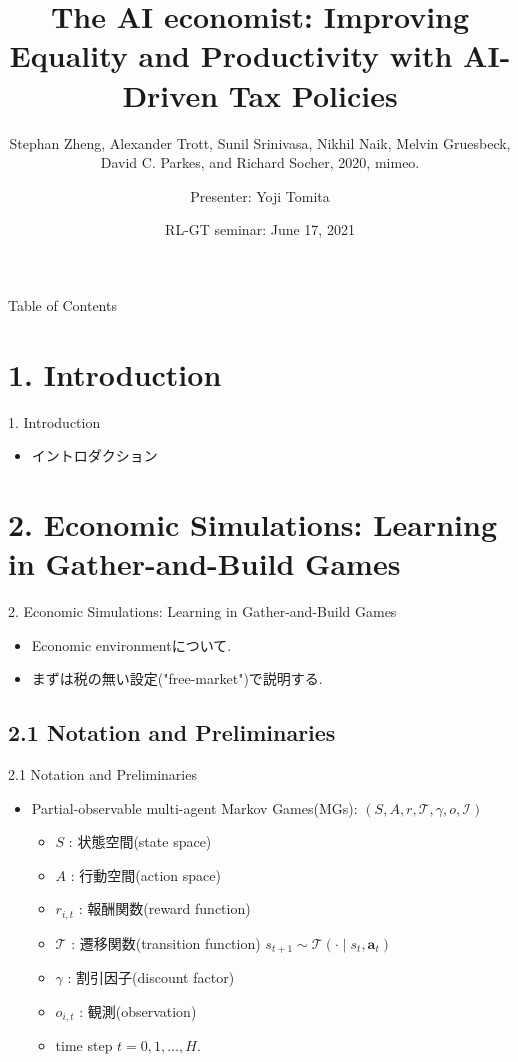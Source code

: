 \documentclass[unicode,aspectratio=169,11pt]{beamer}
\title{
    The AI economist:
    Improving Equality and Productivity with AI-Driven Tax Policies
}
\subtitle{Stephan Zheng, Alexander Trott, Sunil Srinivasa, Nikhil Naik, Melvin Gruesbeck, David C. Parkes, and Richard Socher, 2020, mimeo.}
\author{Presenter: Yoji Tomita}
\date{RL-GT seminar: June 17, 2021}
\begin{document}
\maketitle

\begin{frame}{Table of Contents}
    \setcounter{tocdepth}{1}
    \tableofcontents
\end{frame}

\section{1. Introduction}
\begin{frame}{1. Introduction}
    \begin{itemize}
        \item イントロダクション
    \end{itemize}
\end{frame}

\section{2. Economic Simulations: Learning in Gather-and-Build Games}

\begin{frame}{2. Economic Simulations: Learning in Gather-and-Build Games}{}
    \begin{itemize}
        \item Economic environmentについて.
        \item まずは税の無い設定("free-market")で説明する.
    \end{itemize}
\end{frame}

\subsection{2.1 Notation and Preliminaries}
\begin{frame}{2.1 Notation and Preliminaries}
    \begin{itemize}
        \item Partial-observable multi-agent Markov Games(MGs): $(S, A, r, \mathscr{T}, \gamma, o, \mathscr{I})$
        \begin{itemize}
            \item $S$ : 状態空間(state space)
            \item $A$ : 行動空間(action space)
            \item $r_{i,t}$ : 報酬関数(reward function)
            \item $\mathscr{T}$ : 遷移関数(transition function)  $s_{t+1} \sim \mathscr{T}(\cdot \mid s_t, \bm{a}_t)$
            \item $\gamma$ : 割引因子(discount factor)
            \item $o_{i,t}$ : 観測(observation)
            \item time step $t = 0, 1, \dots, H$.
        \end{itemize}
    \end{itemize}
\end{frame}
\end{document}
